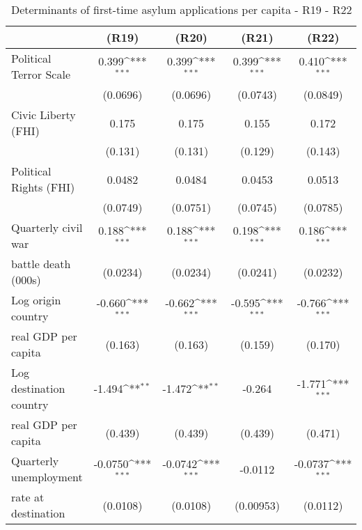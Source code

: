 \begin{table}[htbp]\centering  \footnotesize
\def\sym#1{\ifmmode^{#1}\else\(^{#1}\)\fi}
\caption{Determinants of first-time asylum applications per capita - R19 - R22}
\begin{tabular}{l*{4}{c}}
\hline\hline
                    &\multicolumn{1}{c}{(R19)}         &\multicolumn{1}{c}{(R20)}         &\multicolumn{1}{c}{(R21)}         &\multicolumn{1}{c}{(R22)}         \\
\hline
Political Terror Scale&       0.399\sym{***}&       0.399\sym{***}&       0.399\sym{***}&       0.410\sym{***}\\
                    &    (0.0696)         &    (0.0696)         &    (0.0743)         &    (0.0849)         \\
[0,5em]
Civic Liberty (FHI) &       0.175         &       0.175         &       0.155         &       0.172         \\
                    &     (0.131)         &     (0.131)         &     (0.129)         &     (0.143)         \\
[0,5em]
Political Rights (FHI)&      0.0482         &      0.0484         &      0.0453         &      0.0513         \\
                    &    (0.0749)         &    (0.0751)         &    (0.0745)         &    (0.0785)         \\
[0,5em]
Quarterly civil war&       0.188\sym{***}&       0.188\sym{***}&       0.198\sym{***}&       0.186\sym{***}\\
 battle death (000s)                    &    (0.0234)         &    (0.0234)         &    (0.0241)         &    (0.0232)         \\
[0,5em]
Log origin country &      -0.660\sym{***}&      -0.662\sym{***}&      -0.595\sym{***}&      -0.766\sym{***}\\
real GDP per capita                    &     (0.163)         &     (0.163)         &     (0.159)         &     (0.170)         \\
[0,5em]
Log destination country&      -1.494\sym{**} &      -1.472\sym{**} &      -0.264         &      -1.771\sym{***}\\
 real GDP per capita                    &     (0.439)         &     (0.439)         &     (0.439)         &     (0.471)         \\
[0,5em]
Quarterly unemployment&     -0.0750\sym{***}&     -0.0742\sym{***}&     -0.0112         &     -0.0737\sym{***}\\
 rate at destination                    &    (0.0108)         &    (0.0108)         &   (0.00953)         &    (0.0112)         \\

\end{tabular}
\end{table}
